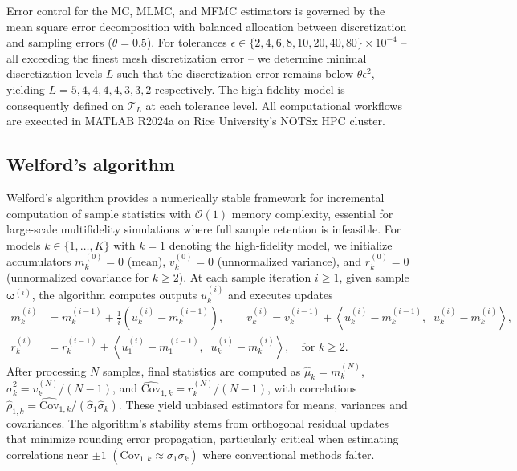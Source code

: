 Error control for the MC, MLMC, and MFMC estimators is governed by the mean square error decomposition with balanced allocation between discretization and sampling errors ($\theta = 0.5$). For tolerances $\epsilon \in \{2,4,6,8,10,20,40,80\} \times 10^{-4}$ -- all exceeding the finest mesh discretization error -- we determine minimal discretization levels $L$ such that the discretization error remains below $\theta \epsilon^2$, yielding $L = 5,4,4,4,4,3,3,2 $ respectively. The high-fidelity model is consequently defined on $\mathcal{T}_L$ at each tolerance level. All computational workflows are executed in MATLAB R2024a on Rice University's NOTSx HPC cluster.






\subsection{Welford's algorithm}
Welford's algorithm \cite{Welford:1962} provides a numerically stable framework for incremental computation of sample statistics with $\mathcal{O}(1)$ memory complexity, essential for large-scale multifidelity simulations where full sample retention is infeasible. For models $k \in \{1, \dots, K\}$ with $k=1$ denoting the high-fidelity model, we initialize accumulators $m_k^{(0)} = 0$ (mean), $v_k^{(0)} = 0$ (unnormalized variance), and $r_k^{(0)} = 0$ (unnormalized covariance for $k \geq 2$). At each sample iteration $i \geq 1$, given sample $\boldsymbol{\omega}^{(i)}$, the algorithm computes outputs $u_k^{(i)}$ and executes updates
%
\begin{align*}
    m_k^{(i)} &= m_k^{(i-1)} + \frac{1}{i}\left( u_{k}^{(i)}-m_k^{(i-1)}\right),\qquad v_k^{(i)} = v_k^{(i-1)} + \left\langle  u_{k}^{(i)}-m_k^{(i-1)}, \;\; u_{k}^{(i)}-m_k^{(i)}\right\rangle,\\
    r_k^{(i)} &= r_k^{(i-1)} + \left \langle  u_{1}^{(i)}-m_{1}^{(i-1)},\;\; u_{k}^{(i)}- m_{k}^{(i)}\right\rangle, \quad \text{for }k\ge 2.
\end{align*}
%
After processing $N$ samples, final statistics are computed as $\widehat{\mu}_k = m_k^{(N)}$, $\widehat{\sigma}_k^2 = v_k^{(N)}/(N-1)$, and $\widehat{\text{Cov}}_{1,k} = r_k^{(N)}/(N-1)$, with correlations $\widehat{\rho}_{1,k} = \widehat{\text{Cov}}_{1,k}/(\widehat{\sigma}_1 \widehat{\sigma}_k)$. These yield unbiased estimators for means, variances and covariances. The algorithm's stability stems from orthogonal residual updates that minimize rounding error propagation, particularly critical when estimating correlations near $\pm 1$ $(\text{Cov}_{1,k}\approx \sigma_1\sigma_k)$ where conventional methods falter.

